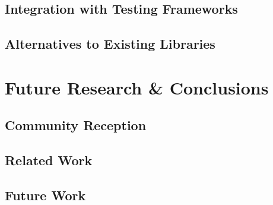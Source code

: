 \documentclass[openright, dottedtoc, headinclude, footinclude=true, a4paper, numbers=noenddot, fontsize=10pt]{scrreprt}
\begin{document}
  \subsection{Integration with Testing Frameworks}
  \label{sec:practice-integration}
  

  \subsection{Alternatives to Existing Libraries}
  \label{sec:practice-alternatives}
  

\section{Future Research \& Conclusions}
\label{chap:conclusions}


  \subsection{Community Reception}
  \label{sec:conclusions-reception}
  

  \subsection{Related Work}
  \label{sec:conclusions-related}
  

  \subsection{Future Work}
  \label{sec:conclusions-future}
  

\if@openright
  \cleardoublepage
\else
  \clearpage
\fi



\end{document}
